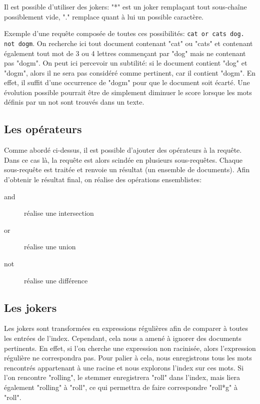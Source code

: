 \documentclass[a4paper,10pt]{report}
\begin{document}
Il est possible d'utiliser des jokers: "*" est un joker rempla\c{c}ant tout sous-chaîne possiblement vide, "." remplace quant \`a lui un possible caract\`ere.

Exemple d'une requ\^ete compos\'ee de toutes ces possibilit\'es: \texttt{cat or cats dog. not dogm}. On recherche ici tout document contenant "cat" ou "cats" et contenant \'egalement tout mot de 3 ou 4 lettres commen\c{c}ant par "dog" mais ne contenant pas "dogm". On peut ici percevoir un subtilit\'e: si le document contient "dog" et "dogm", alors il ne sera pas consid\'er\'e comme pertinent, car il contient "dogm". En effet, il suffit d'une occurrence de "dogm" pour que le document soit \'ecart\'e.  Une évolution possible pourrait être de simplement diminuer le score lorsque les mots définis par un not sont trouvés dans un texte.

\subsection{Les op\'erateurs}

Comme abord\'e ci-dessus, il est possible d'ajouter des op\'erateurs \`a la requ\^ete. Dans ce cas l\`a, la requ\^ete est alors scind\'ee en plusieurs sous-requ\^etes. Chaque sous-requ\^ete est trait\'ee et renvoie un r\'esultat (un ensemble de documents). Afin d'obtenir le r\'esultat final, on r\'ealise des op\'erations ensemblistes:

\begin{description}
 \item[and] r\'ealise une intersection
 \item[or] r\'ealise une union
 \item[not] r\'ealise une diff\'erence
\end{description}

\subsection{Les jokers}

Les jokers sont transform\'ees en expressions r\'eguli\`eres afin de comparer \`a toutes les entr\'ees de l'index. Cependant, cela nous a amen\'e \`a ignorer des documents pertinents. En effet, si l'on cherche une expression non racinis\'ee, alors l'expression r\'eguli\`ere ne correspondra pas. Pour palier \`a cela, nous enregistrons tous les mots rencontr\'es appartenant \`a une racine et nous explorons l'index sur ces mots. Si l'on rencontre "rolling", le stemmer enregistrera "roll" dans l'index, mais liera \'egalement "rolling" \`a "roll", ce qui permettra de faire correspondre "roll*g" \`a "roll". 
\end{document}
